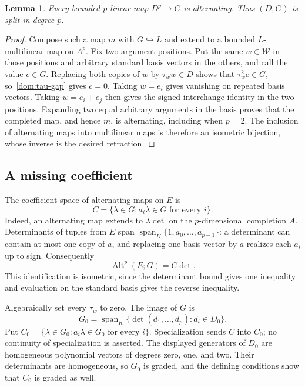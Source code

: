\documentclass[11pt]{amsart}
\newtheorem{lemma}[theorem]{Lemma}
\theoremstyle{definition}
\theoremstyle{remark}
\numberwithin{equation}{section}
\newcommand{\Alt}{\operatorname{Alt}}
\newcommand{\spn}{\operatorname{span}}
\theoremstyle{plain}
\theoremstyle{definition}
\theoremstyle{plain}
\begin{document}
\begin{lemma}\label{dom:all-alt}
Every bounded $p$\nobreakdash-linear map $D^p\to G$ is alternating. Thus $(D,G)$ is split in degree $p$.
\end{lemma}

\begin{proof}
Compose such a map $m$ with $G\hookrightarrow L$ and extend to a bounded $L$\nobreakdash-multilinear map
on $A^p$. Fix two argument positions. Put the same $w\in\mathcal W$ in those positions and arbitrary
standard basis vectors in the others, and call the value $c\in G$. Replacing both copies of $w$ by
$\tau_w w\in D$ shows that $\tau_w^2c\in G$, so~\eqref{dom:tau-gap} gives $c=0$.
Taking $w=e_i$ gives vanishing on repeated basis vectors. Taking $w=e_i+e_j$ then gives the signed
interchange identity in the two positions. Expanding two equal arbitrary arguments in the basis proves
that the completed map, and hence $m$, is alternating, including when $p=2$. The inclusion of alternating
maps into multilinear maps is therefore an isometric bijection, whose inverse is the desired retraction.
\end{proof}

\subsection{A missing coefficient}

The coefficient space of alternating maps on $E$ is
\[
C=\{\lambda\in G:a_i\lambda\in G\text{ for every }i\}.
\]
Indeed, an alternating map extends to $\lambda\det$ on the $p$\nobreakdash-dimensional completion $A$.
Determinants of tuples from $E$ span $\spn_K\{1,a_0,\ldots,a_{p-1}\}$: a determinant can contain at
most one copy of $a$, and replacing one basis vector by $a$ realizes each $a_i$ up to sign. Consequently
\begin{equation}\label{dom:coefficient-space}
\Alt^p(E;G)=C\det.
\end{equation}
This identification is isometric, since the determinant bound gives one inequality and evaluation on the
standard basis gives the reverse inequality.

Algebraically set every $\tau_w$ to zero. The image of $G$ is
\[
G_0=\spn_K\{\det(d_1,\ldots,d_p):d_i\in D_0\}.
\]
Put $C_0=\{\lambda\in G_0:a_i\lambda\in G_0\text{ for every }i\}$. Specialization sends $C$ into $C_0$;
no continuity of specialization is asserted. The displayed generators of $D_0$ are homogeneous polynomial
vectors of degrees zero, one, and two. Their determinants are homogeneous, so $G_0$ is graded, and the
defining conditions show that $C_0$ is graded as well.
\end{document}
